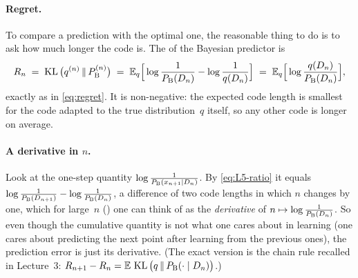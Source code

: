\paragraph{Regret.}
To compare a prediction with the optimal one, the reasonable thing to do is to ask how much longer the code is. The  of the Bayesian predictor is
\begin{equation}\label{eq:L5-regret}
  R_n\;=\;\operatorname{KL}\big(q^{(n)}\,\|\,P_{\mathrm{B}}^{(n)}\big)\;=\;\mathbb{E}_q\Big[\log\frac1{P_{\mathrm{B}}(D_n)}-\log\frac1{q(D_n)}\Big]\;=\;\mathbb{E}_q\Big[\log\frac{q(D_n)}{P_{\mathrm{B}}(D_n)}\Big],
\end{equation}
exactly as in \eqref{eq:regret}. It is non-negative: the expected code length is smallest for the code adapted to the true distribution~$q$ itself, so any other code is longer on average.

\paragraph{A derivative in $n$.}
Look at the one-step quantity $\log\frac1{P_{\mathrm{B}}(x_{n+1}\mid D_n)}$. By \eqref{eq:L5-ratio} it equals $\log\frac1{P_{\mathrm{B}}(D_{n+1})}-\log\frac1{P_{\mathrm{B}}(D_n)}$, a difference of two code lengths in which $n$ changes by one, which for large~$n$ () one can think of as the \emph{derivative} of $n\mapsto\log\frac1{P_{\mathrm{B}}(D_n)}$. So even though the cumulative quantity is not what one cares about in learning (one cares about predicting the next point after learning from the previous ones), the prediction error is just its derivative. (The exact version is the chain rule recalled in Lecture~3: $R_{n+1}-R_n=\mathbb{E}\,\operatorname{KL}\big(q\,\|\,P_{\mathrm{B}}(\cdot\mid D_n)\big)$.)


